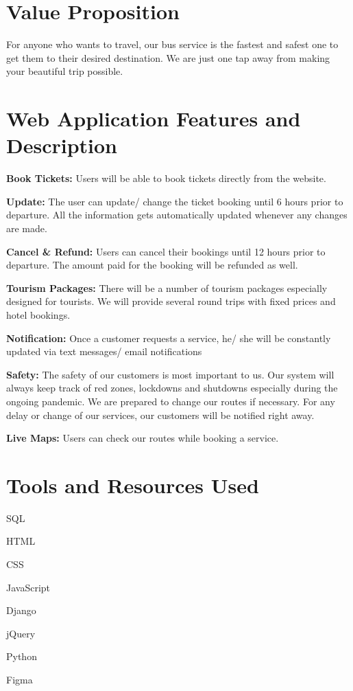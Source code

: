 \documentclass[11pt]{article}
\begin{document}
    \section*{Value Proposition}
     {\sffamily
    For anyone who wants to travel, our bus service is the fastest and safest one to get them to their desired destination. We are just one tap away from making your beautiful trip possible.}
   
   
    \section*{Web Application Features and Description}

 
    \begin{itemize}
     {\sffamily
    \item \textbf{Book Tickets:} Users will be able to book tickets directly from the website. 
    \item \textbf{Update:} The user can update/ change the ticket booking until 6 hours prior to departure. All the information gets automatically updated whenever any changes are made. 
    \item \textbf{Cancel \& Refund:} Users can cancel their bookings until 12 hours prior to departure. The amount paid for the booking will be refunded as well.
    \item \textbf{Tourism Packages:} There will be a number of tourism packages especially designed for tourists. We will provide several round trips with fixed prices and hotel bookings. 
    \item \textbf{Notification:} Once a customer requests a service, he/ she will be constantly updated via text messages/ email notifications 
    \item \textbf{Safety:} The safety of our customers is most important to us. Our system will always keep track of red zones, lockdowns and shutdowns especially during the ongoing pandemic. We are prepared to change our routes if necessary. For any delay or change of our services, our customers will be notified right away.
    \item \textbf{Live Maps:} Users can check our routes while booking a service.
    }
    \end{itemize}
    
    
    \section*{Tools and Resources Used}
    \begin{itemize}
      {\sffamily
    \item SQL
    \item HTML
    \item CSS
    \item JavaScript
    \item Django
    \item jQuery
    \item Python
    \item Figma
    }
    
    \end{itemize}
\end{document}
